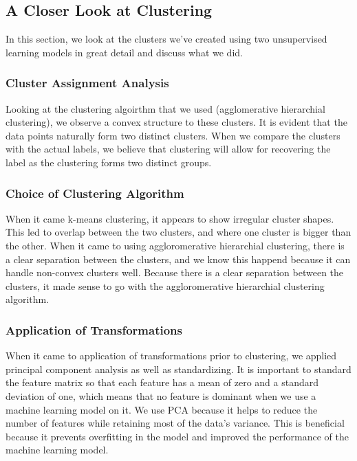 \documentclass[a4paper, twocolumn]{article}
\begin{document}
\subsection{A Closer Look at Clustering}
In this section, we look at the clusters we've created using two unsupervised learning models in great detail and discuss what we did.

\subsubsection{Cluster Assignment Analysis}
Looking at the clustering algoirthm that we used (agglomerative hierarchial clustering), we observe a convex structure to these clusters. It is evident that
the data points naturally form two distinct clusters. When we compare the clusters with the actual labels, we believe that clustering will allow for 
recovering the label as the clustering forms two distinct groups.

\subsubsection{Choice of Clustering Algorithm}
When it came k-means clustering, it appears to show irregular cluster shapes. This led to overlap between the two clusters, and where one cluster is bigger
than the other. When it came to using aggloromerative hierarchial clustering, there is a clear separation between the clusters, and we know this happend 
because it can handle non-convex clusters well. Because there is a clear separation between the clusters, it made sense to go with the aggloromerative 
hierarchial clustering algorithm.

\subsubsection{Application of Transformations}
When it came to application of transformations prior to clustering, we applied principal component analysis as well as standardizing. It is important to
standard the feature matrix so that each feature has a mean of zero and a standard deviation of one, which means that no feature is dominant when we use
a machine learning model on it. We use PCA because it helps to reduce the number of features while retaining most of the data's variance. This is beneficial
because it prevents overfitting in the model and improved the performance of the machine learning model.
\end{document}
